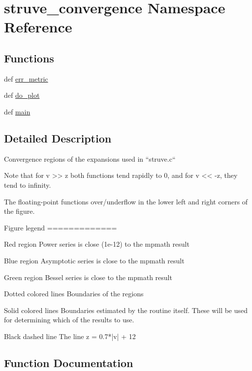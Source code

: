 \hypertarget{namespacestruve__convergence}{}\section{struve\+\_\+convergence Namespace Reference}
\label{namespacestruve__convergence}
\subsection*{Functions}
\begin{DoxyCompactItemize}
\item 
def \hyperlink{namespacestruve__convergence_adf702393c0692fadf08da89cfb5af245}{err\+\_\+metric}
\item 
def \hyperlink{namespacestruve__convergence_aafd108cf0542aaa10f4b1954a693b63e}{do\+\_\+plot}
\item 
def \hyperlink{namespacestruve__convergence_aae15cad603f4b72f108b79b57d9fba7d}{main}
\end{DoxyCompactItemize}


\subsection{Detailed Description}
\begin{DoxyVerb}Convergence regions of the expansions used in ``struve.c``

Note that for v >> z both functions tend rapidly to 0,
and for v << -z, they tend to infinity.

The floating-point functions over/underflow in the lower left and right
corners of the figure.


Figure legend
=============

Red region
Power series is close (1e-12) to the mpmath result

Blue region
Asymptotic series is close to the mpmath result

Green region
Bessel series is close to the mpmath result

Dotted colored lines
Boundaries of the regions

Solid colored lines
Boundaries estimated by the routine itself. These will be used
for determining which of the results to use.

Black dashed line
The line z = 0.7*|v| + 12\end{DoxyVerb}
 

\subsection{Function Documentation}
\hypertarget{namespacestruve__convergence_aafd108cf0542aaa10f4b1954a693b63e}{}

